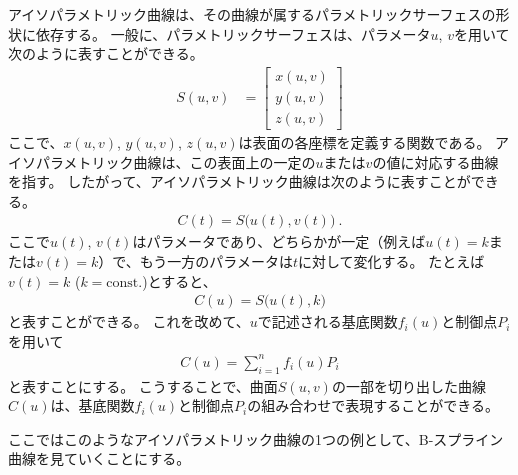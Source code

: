 

アイソパラメトリック曲線は、その曲線が属するパラメトリックサーフェスの形状に依存する。
一般に、パラメトリックサーフェスは、パラメータ$u$, $v$を用いて次のように表すことができる。
\begin{align*}
  S(u, v) &=
  \left[
  \begin{array}{c}
    x(u, v)\\
    y(u, v)\\
    z(u, v)
  \end{array}
  \right]
\end{align*}
ここで、$x(u,v)$, $y(u,v)$, $z(u,v)$は表面の各座標を定義する関数である。
アイソパラメトリック曲線は、この表面上の一定の$u$または$v$の値に対応する曲線を指す。
したがって、アイソパラメトリック曲線は次のように表すことができる。
\begin{align*}
  C(t) = S\big(u(t), v(t)\big)\ .
\end{align*}
ここで$u(t)$, $v(t)$はパラメータであり、どちらかが一定（例えば$u(t)=k$または$v(t)=k$）で、もう一方のパラメータは$t$に対して変化する。
たとえば$v(t) = k$ ($k = \text{const.}$)とすると、
\begin{align*}
  C(u) = S\big(u(t), k\big)
\end{align*}
と表すことができる。
これを改めて、$u$で記述される基底関数$f_i(u)$と制御点$P_i$を用いて
\begin{align*}
  C(u) = \sum_{i=1}^nf_i(u)P_i
\end{align*}
と表すことにする。
こうすることで、曲面$S(u, v)$の一部を切り出した曲線$C(u)$は、基底関数$f_i(u)$と制御点$P_i$の組み合わせで表現することができる。

ここではこのようなアイソパラメトリック曲線の1つの例として、B-スプライン曲線を見ていくことにする。



